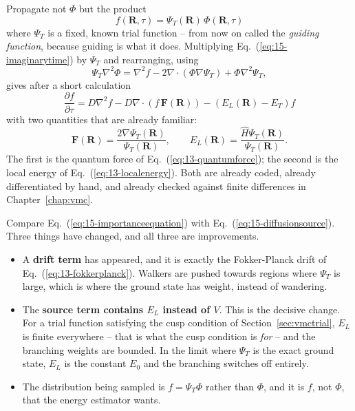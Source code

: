 Propagate not $\Phi$ but the product
\begin{equation}
  \boxed{\;f(\bm{R},\tau) = \Psi_T(\bm{R})\,\Phi(\bm{R},\tau)\;}
  \label{eq:15-mixeddistribution}
\end{equation}
where $\Psi_T$ is a fixed, known trial function -- from now on called the
\emph{guiding function}, because guiding is what it does.  Multiplying
Eq.~(\ref{eq:15-imaginarytime}) by $\Psi_T$ and rearranging, using
\begin{equation*}
  \Psi_T\nabla^2\Phi
   = \nabla^2 f - 2\nabla\!\cdot\!\left(\Phi\nabla\Psi_T\right)
   + \Phi\nabla^2\Psi_T ,
\end{equation*}
gives after a short calculation
\begin{equation}
  \boxed{\;
  \frac{\partial f}{\partial \tau}
   = D\nabla^2 f
   - D\nabla\!\cdot\!\left(f\,\bm{F}(\bm{R})\right)
   - \left(E_L(\bm{R}) - E_T\right) f \;}
  \label{eq:15-importanceequation}
\end{equation}
with two quantities that are already familiar:
\begin{equation}
  \bm{F}(\bm{R}) = \frac{2\nabla\Psi_T(\bm{R})}{\Psi_T(\bm{R})},
  \qquad
  E_L(\bm{R}) = \frac{\hat{H}\Psi_T(\bm{R})}{\Psi_T(\bm{R})} .
  \label{eq:15-driftandlocal}
\end{equation}
The first is the quantum force of Eq.~(\ref{eq:13-quantumforce}); the second
is the local energy of Eq.~(\ref{eq:13-localenergy}).  Both are already coded,
already differentiated by hand, and already checked against finite differences
in Chapter~\ref{chap:vmc}.

Compare Eq.~(\ref{eq:15-importanceequation}) with
Eq.~(\ref{eq:15-diffusionsource}).  Three things have changed, and all three
are improvements.

\begin{svgraybox}
\begin{itemize}
\item A \textbf{drift term} has appeared, and it is exactly the Fokker-Planck
  drift of Eq.~(\ref{eq:13-fokkerplanck}).  Walkers are pushed towards regions
  where $\Psi_T$ is large, which is where the ground state has weight, instead
  of wandering.
\item The \textbf{source term contains $E_L$ instead of $V$}.  This is the
  decisive change.  For a trial function satisfying the cusp condition of
  Section~\ref{sec:vmctrial}, $E_L$ is finite everywhere -- that is what the
  cusp condition is \emph{for} -- and the branching weights are bounded.  In
  the limit where $\Psi_T$ is the exact ground state, $E_L$ is the constant
  $E_0$ and the branching switches off entirely.
\item The distribution being sampled is $f=\Psi_T\Phi$ rather than $\Phi$, and
  it is $f$, not $\Phi$, that the energy estimator wants.
\end{itemize}
\end{svgraybox}

